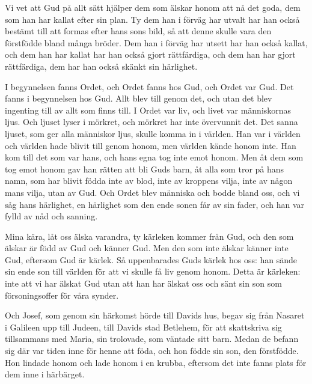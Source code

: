 Vi vet att Gud på allt sätt hjälper dem som älskar honom att nå det goda, dem som han har kallat efter sin plan.
Ty dem han i förväg har utvalt har han också bestämt till att formas efter hans sons bild, så att denne skulle vara den förstfödde bland många bröder.
Dem han i förväg har utsett har han också kallat, och dem han har kallat har han också gjort rättfärdiga, och dem han har gjort rättfärdiga, dem har han också skänkt sin härlighet.





I begynnelsen fanns Ordet, och Ordet fanns hos Gud, och Ordet var Gud.
Det fanns i begynnelsen hos Gud.
Allt blev till genom det, och utan det blev ingenting till av allt som finns till.
I Ordet var liv, och livet var människornas ljus.
Och ljuset lyser i mörkret, och mörkret har inte övervunnit det.
Det sanna ljuset, som ger alla människor ljus, skulle komma in i världen.
Han var i världen och världen hade blivit till genom honom, men världen kände honom inte.
Han kom till det som var hans, och hans egna tog inte emot honom.
Men åt dem som tog emot honom gav han rätten att bli Guds barn, åt alla som tror på hans namn,
som har blivit födda inte av blod, inte av kroppens vilja, inte av någon mans vilja, utan av Gud.
Och Ordet blev människa och bodde bland oss, och vi såg hans härlighet, en härlighet som den ende sonen får av sin fader, och han var fylld av nåd och sanning.



Mina kära, låt oss älska varandra, ty kärleken kommer från Gud, och den som älskar är född av Gud och känner Gud.
Men den som inte älskar känner inte Gud, eftersom Gud är kärlek.
Så uppenbarades Guds kärlek hos oss: han sände sin ende son till världen för att vi skulle få liv genom honom.
Detta är kärleken: inte att vi har älskat Gud utan att han har älskat oss och sänt sin son som försoningsoffer för våra synder.





Och Josef, som genom sin härkomst hörde till Davids hus, begav sig från Nasaret i Galileen upp till Judeen, till Davids stad Betlehem,
för att skattskriva sig tillsammans med Maria, sin trolovade, som väntade sitt barn.
Medan de befann sig där var tiden inne för henne att föda,
och hon födde sin son, den förstfödde. Hon lindade honom och lade honom i en krubba, eftersom det inte fanns plats för dem inne i härbärget.




